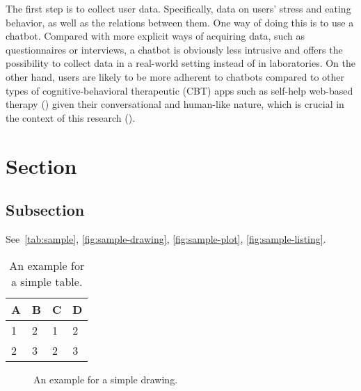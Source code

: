 \noindent The first step is to collect user data. Specifically, data on users’ stress and eating behavior, as well as the relations between them. One way of doing this is to use a chatbot. Compared with more explicit ways of acquiring data, such as questionnaires or interviews, a chatbot is obviously less intrusive and offers the possibility to collect data in a real-world setting instead of in laboratories. On the other hand, users are likely to be more adherent to chatbots compared to other types of cognitive-behavioral therapeutic (CBT) apps such as self-help web-based therapy (\cite{6_cbt}) given their conversational and human-like nature, which is crucial in the context of this research (\cite{7_woebot}).

\section{Section}

\subsection{Subsection}

See~\autoref{tab:sample}, \autoref{fig:sample-drawing}, \autoref{fig:sample-plot}, \autoref{fig:sample-listing}.

\begin{table}[htpb]
  \caption[Example table]{An example for a simple table.}\label{tab:sample}
  \centering
  \begin{tabular}{l l l l}
    \toprule
      A & B & C & D \\
    \midrule
      1 & 2 & 1 & 2 \\
      2 & 3 & 2 & 3 \\
    \bottomrule
  \end{tabular}
\end{table}

\begin{figure}[htpb]
  \centering
  \caption[Example drawing]{An example for a simple drawing.}\label{fig:sample-drawing}
\end{figure}

